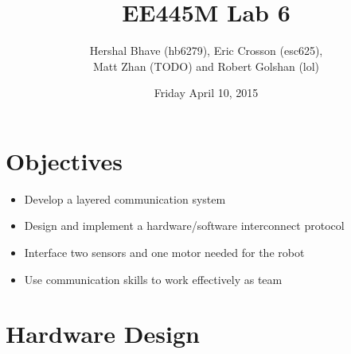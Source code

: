 \documentclass[12pt]{article}
\title{EE445M Lab 6}
\author{Hershal Bhave (hb6279), Eric Crosson (esc625), \\
  Matt Zhan (TODO) and Robert Golshan (lol)}
\date{Friday April 10, 2015}
\begin{document}
\maketitle

\section{Objectives}

\begin{itemize}
\item Develop a layered communication system
\item Design and implement a hardware/software interconnect protocol
\item Interface two sensors and one motor needed for the robot
\item Use communication skills to work effectively as team
\end{itemize}

\section{Hardware Design}
\end{document}
